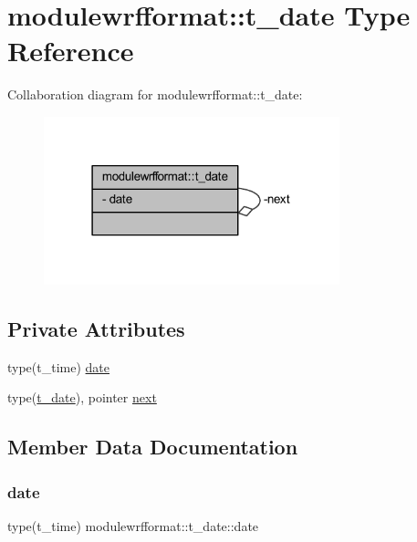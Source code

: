 \hypertarget{structmodulewrfformat_1_1t__date}{}\section{modulewrfformat\+:\+:t\+\_\+date Type Reference}
\label{structmodulewrfformat_1_1t__date}


Collaboration diagram for modulewrfformat\+:\+:t\+\_\+date\+:\nopagebreak
\begin{figure}[H]
\begin{center}
\leavevmode
\includegraphics[width=243pt]{structmodulewrfformat_1_1t__date__coll__graph}
\end{center}
\end{figure}
\subsection*{Private Attributes}
\begin{DoxyCompactItemize}
\item 
type(t\+\_\+time) \mbox{\hyperlink{structmodulewrfformat_1_1t__date_a9097968f2cddc15e6fb93f3625873733}{date}}
\item 
type(\mbox{\hyperlink{structmodulewrfformat_1_1t__date}{t\+\_\+date}}), pointer \mbox{\hyperlink{structmodulewrfformat_1_1t__date_ac60560d4a5bc28966cdf4f490895c69d}{next}}
\end{DoxyCompactItemize}


\subsection{Member Data Documentation}
\mbox{\label{structmodulewrfformat_1_1t__date_a9097968f2cddc15e6fb93f3625873733}} 
\subsubsection{\texorpdfstring{date}{date}}
{\footnotesize\ttfamily type(t\+\_\+time) modulewrfformat\+::t\+\_\+date\+::date\hspace{0.3cm}{\ttfamily [private]}}

